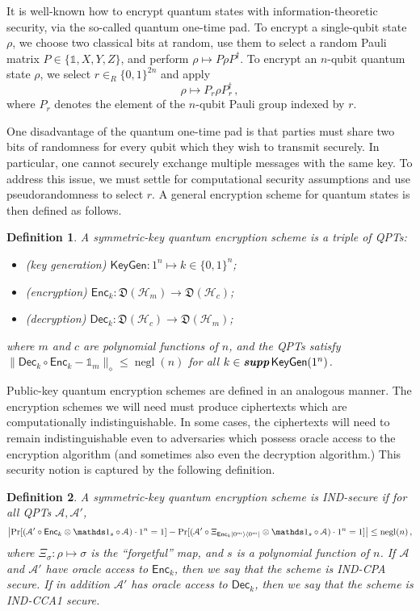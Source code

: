 \documentclass[11pt]{article}
\numberwithin{equation}{section}
\newtheorem{definition}{Definition}
\newcommand{\one}{\mathds 1}
\newcommand{\opn}{\operatorname}
\newcommand{\algo}{\mathcal}
\newcommand{\negl}{\opn{negl}}
\newcommand{\KeyGen}{\ensuremath{\mathsf{KeyGen}}\xspace}
\newcommand{\Enc}{\ensuremath{\mathsf{Enc}}\xspace}
\newcommand{\Dec}{\ensuremath{\mathsf{Dec}}\xspace}
\newcommand{\inrand}{\in_R}
\newcommand{\prob}{\opn{Pr}}
\newcommand{\states}{\mathfrak D}
\newcommand\supp{\textbf{supp}}
\begin{document}
It is well-known how to encrypt quantum states with information-theoretic security, via the so-called quantum one-time pad. To encrypt a single-qubit state $\rho$, we choose two classical bits at random, use them to select a random Pauli matrix $P \in \{\one, X, Y, Z\}$, and perform $\rho \mapsto P \rho P^\dagger$. To encrypt an $n$-qubit quantum state $\rho$, we select $r \inrand \{0,1\}^{2n}$ and apply
\begin{equation}\label{eq:quantum-one-time-pad}
\rho \longmapsto P_r \rho P_r^\dagger\,,
\end{equation}
where $P_r$ denotes the element of the $n$-qubit Pauli group indexed by $r$. 

One disadvantage of the quantum one-time pad is that parties must share two bits of randomness for every qubit which they wish to transmit securely. In particular, one cannot securely exchange multiple messages with the same key. To address this issue, we must settle for computational security assumptions and use pseudorandomness to select $r$. A general encryption scheme for quantum states is then defined as follows.

\begin{definition}\label{def:encryption-scheme}
A symmetric-key quantum encryption scheme is a triple of QPTs:
\begin{itemize}
\item (key generation) $\KeyGen : 1^n \longmapsto k \in \{0, 1\}^n$;
\item (encryption) $\Enc_k : \states (\mathcal H_m) \longrightarrow \states (\mathcal H_c)$;
\item (decryption) $\Dec_k : \states (\mathcal H_c) \longrightarrow \states (\mathcal H_m)$;
\end{itemize}
where $m$ and $c$ are polynomial functions of $n$, and the QPTs satisfy $\| \Dec_k \circ \Enc_k - \one_m \|_\diamond \leq \negl(n)$ for all $k \in \emph{\supp}\,\KeyGen(1^n)$.
\end{definition}

Public-key quantum encryption schemes are defined in an analogous manner. The encryption schemes we will need must produce ciphertexts which are computationally indistinguishable. In some cases, the ciphertexts will need to remain indistinguishable even to adversaries which possess oracle access to the encryption algorithm (and sometimes also even the decryption algorithm.) This security notion is captured by the following definition.

\begin{definition}\label{def:IND}
A symmetric-key quantum encryption scheme is IND-secure if for all QPTs $\algo A, \algo A'$,
$$
\left|\prob[ (\algo A' \circ \Enc_k \otimes \one_s \circ \algo A) \cdot 1^n = 1] -
\prob[ (\algo A' \circ \Xi_{\Enc_k \ket{0^m}\bra{0^m}} \otimes \one_s \circ \algo A) \cdot 1^n = 1] \right|
\leq \negl(n)\,,
$$ 
where $\Xi_\sigma: \rho \mapsto \sigma$ is the ``forgetful'' map, and $s$ is a polynomial function of $n$. If $\algo A$ and $\algo A'$ have oracle access to $\Enc_k$, then we say that the scheme is IND-CPA secure. If in addition $\algo A'$ has oracle access to $\Dec_k$, then we say that the scheme is IND-CCA1 secure.
\end{definition}
\end{document}
